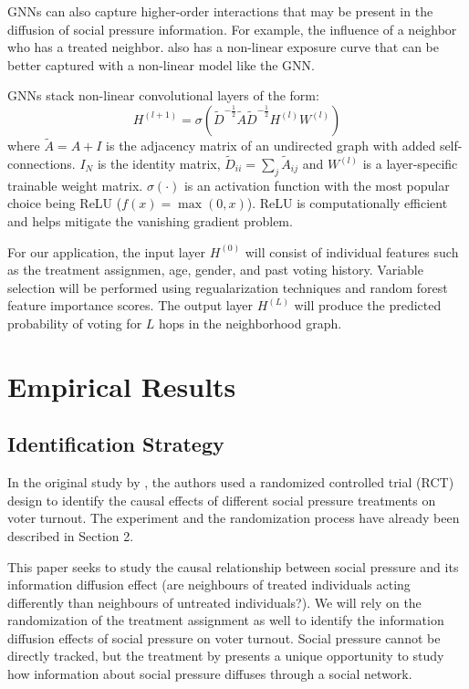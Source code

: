 \documentclass[11pt]{article}
\begin{document}
GNNs can also capture higher-order interactions that may be present in the diffusion of social pressure information. For example, the influence of a neighbor who has a treated neighbor. \cite{myers_information_2012} also has a non-linear exposure curve that can be better captured with a non-linear model like the GNN.

GNNs stack non-linear convolutional layers of the form:
\begin{equation*}
    H^{(l+1)} = \sigma(\tilde{D}^{-\frac{1}{2}}\tilde{A}\tilde{D}^{-\frac{1}{2}}H^{(l)}W^{(l)})
\end{equation*}
where $\tilde{A} = A + I$ is the adjacency matrix of an undirected graph with added self-connections. $I_N$ is the identity matrix, $\tilde{D}_{ii} = \sum_j \tilde{A}_{ij}$ and $W^{(l)}$ is a layer-specific trainable weight matrix. $\sigma(\cdot)$ is an activation function with the most popular choice being ReLU ($f(x) = \max(0,x)$). ReLU is computationally efficient and helps mitigate the vanishing gradient problem.

For our application, the input layer $H^{(0)}$ will consist of individual features such as the treatment assignmen, age, gender, and past voting history. Variable selection will be performed using regualarization techniques and random forest feature importance scores. The output layer $H^{(L)}$ will produce the predicted probability of voting for $L$ hops in the neighborhood graph.

\section{Empirical Results}
\subsection{Identification Strategy}
In the original study by \cite{gerber_social_2008}, the authors used a randomized controlled trial (RCT) design to identify the causal effects of different social pressure treatments on voter turnout. The experiment and the randomization process have already been described in Section 2. 

This paper seeks to study the causal relationship between social pressure and its information diffusion effect (are neighbours of treated individuals acting differently than neighbours of untreated individuals?). We will rely on the randomization of the treatment assignment as well to identify the information diffusion effects of social pressure on voter turnout. Social pressure cannot be directly tracked, but the treatment by \cite{gerber_social_2008} presents a unique opportunity to study how information about social pressure diffuses through a social network.
\end{document}
